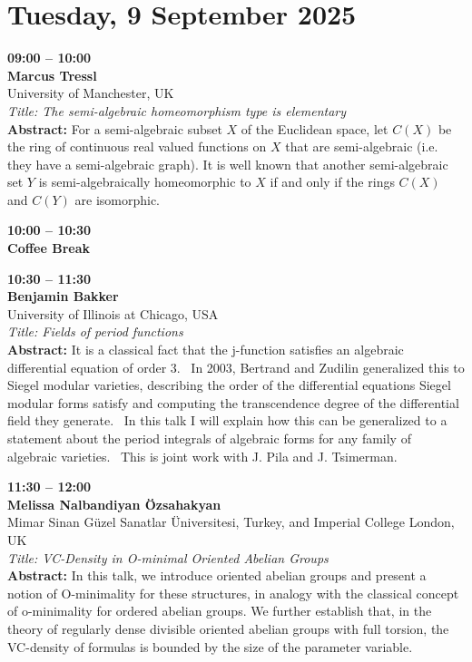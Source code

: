 \documentclass[10pt,a4paper]{article}
\begin{document}
\newpage

\section{Tuesday, 9 September 2025}
\begin{tcolorbox}[talkbox]
\textbf{09:00 -- 10:00} \\
\textbf{Marcus Tressl} \\
University of Manchester, UK \\
\textit{Title: The semi-algebraic homeomorphism type is elementary} \\
\textbf{Abstract:} For a semi-algebraic subset $X$ of the Euclidean space, let $C(X)$ be the ring of continuous real valued functions on $X$ that are semi-algebraic (i.e. they have a semi-algebraic graph). It is well known that another semi-algebraic set $Y$ is semi-algebraically  homeomorphic to $X$ if and only if the rings $C(X)$ and $C(Y)$ are isomorphic.
\end{tcolorbox}
\begin{tcolorbox}[talkbox]
\textbf{10:00 -- 10:30} \\
\textbf{Coffee Break}
\end{tcolorbox}
\begin{tcolorbox}[talkbox]
\textbf{10:30 -- 11:30} \\
\textbf{Benjamin Bakker} \\
University of Illinois at Chicago, USA \\
\textit{Title: Fields of period functions} \\
\textbf{Abstract:} It is a classical fact that the j-function satisfies an algebraic differential equation of order 3.  In 2003, Bertrand and Zudilin generalized this to Siegel modular varieties, describing the order of the differential equations Siegel modular forms satisfy and computing the transcendence degree of the differential field they generate.  In this talk I will explain how this can be generalized to a statement about the period integrals of algebraic forms for any family of algebraic varieties.  This is joint work with J. Pila and J. Tsimerman.
\end{tcolorbox}
\begin{tcolorbox}[talkbox]
\textbf{11:30 -- 12:00} \\
\textbf{Melissa Nalbandiyan Özsahakyan} \\
Mimar Sinan Güzel Sanatlar Üniversitesi, Turkey, and Imperial College London, UK \\
\textit{Title: VC-Density in O-minimal Oriented Abelian Groups} \\
\textbf{Abstract:} In this talk, we introduce oriented abelian groups and present a notion of O-minimality for these structures, in analogy with the classical concept of o-minimality for ordered abelian groups. We further establish that, in the theory of regularly dense divisible oriented abelian groups with full torsion, the VC-density of formulas is bounded by the size of the parameter variable.
\end{tcolorbox}
\end{document}
